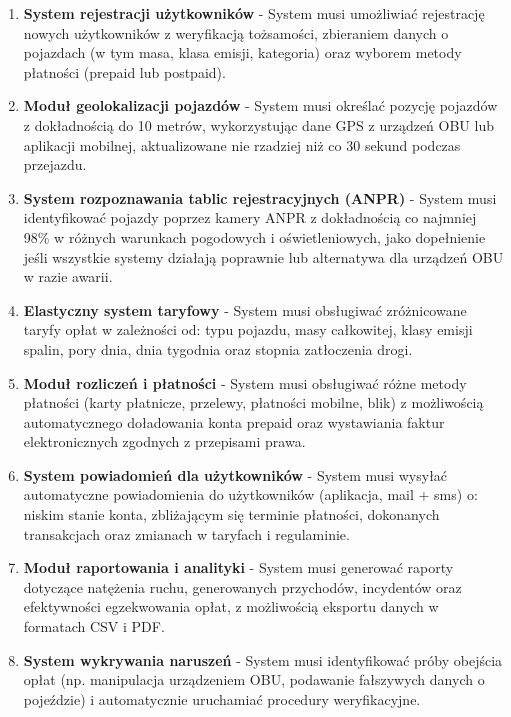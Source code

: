 \documentclass[12pt]{article}
\begin{document}
\begin{enumerate}
    \item \textbf{System rejestracji użytkowników} - System musi umożliwiać rejestrację nowych użytkowników z weryfikacją tożsamości, zbieraniem danych o pojazdach (w tym masa, klasa emisji, kategoria) oraz wyborem metody płatności (prepaid lub postpaid).

    \item \textbf{Moduł geolokalizacji pojazdów} - System musi określać pozycję pojazdów z dokładnością do 10 metrów, wykorzystując dane GPS z urządzeń OBU lub aplikacji mobilnej, aktualizowane nie rzadziej niż co 30 sekund podczas przejazdu.

    \item \textbf{System rozpoznawania tablic rejestracyjnych (ANPR)} - System musi identyfikować pojazdy poprzez kamery ANPR z dokładnością co najmniej 98\% w różnych warunkach pogodowych i oświetleniowych, jako dopełnienie jeśli wszystkie systemy działają poprawnie lub alternatywa dla urządzeń OBU w razie awarii.

    \item \textbf{Elastyczny system taryfowy} - System musi obsługiwać zróżnicowane taryfy opłat w zależności od: typu pojazdu, masy całkowitej, klasy emisji spalin, pory dnia, dnia tygodnia oraz stopnia zatłoczenia drogi.

    \item \textbf{Moduł rozliczeń i płatności} - System musi obsługiwać różne metody płatności (karty płatnicze, przelewy, płatności mobilne, blik) z możliwością automatycznego doładowania konta prepaid oraz wystawiania faktur elektronicznych zgodnych z przepisami prawa.

    \item \textbf{System powiadomień dla użytkowników} - System musi wysyłać automatyczne powiadomienia do użytkowników (aplikacja, mail + sms) o: niskim stanie konta, zbliżającym się terminie płatności, dokonanych transakcjach oraz zmianach w taryfach i regulaminie.

    \item \textbf{Moduł raportowania i analityki} - System musi generować raporty dotyczące natężenia ruchu, generowanych przychodów, incydentów oraz efektywności egzekwowania opłat, z możliwością eksportu danych w formatach CSV i PDF.

    \item \textbf{System wykrywania naruszeń} - System musi identyfikować próby obejścia opłat (np. manipulacja urządzeniem OBU, podawanie fałszywych danych o pojeździe) i automatycznie uruchamiać procedury weryfikacyjne.


\end{enumerate}
\end{document}
